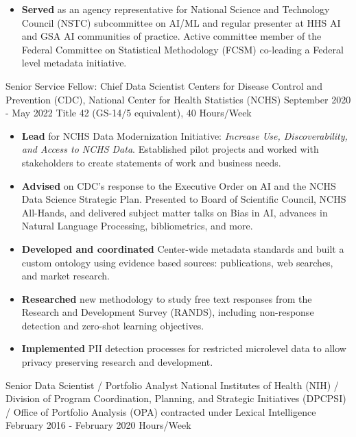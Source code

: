 \documentclass[]{scrartcl}
\begin{document}
\begin{cleanCV}
{\begin{itemize}
      \item \textbf{Served} as an agency representative for National Science and Technology Council (NSTC) subcommittee on AI/ML and regular presenter at HHS AI and GSA AI communities of practice. Active committee member of the Federal Committee on Statistical Methodology (FCSM) co-leading a Federal level metadata initiative.

  \end{itemize}
}

\vspace{1em}

    
  \WorkExperience
{}
{Senior Service Fellow: Chief Data Scientist}
{
  \newline Centers for Disease Control and Prevention (CDC), National Center for
Health Statistics (NCHS)
  \newline September 2020 - May 2022
  \newline Title 42 (GS-14/5 equivalent), 40 Hours/Week
}
{
  \vspace{-0.25em}
  \begin{itemize}

   \item \textbf{Lead} for NCHS Data Modernization Initiative: \emph{Increase Use, Discoverability, and Access to NCHS Data}. Established pilot projects and worked with stakeholders to create statements of work and business needs.
   \item \textbf{Advised} on CDC's response to the Executive Order on AI and the NCHS Data Science Strategic Plan. Presented to Board of Scientific Council, NCHS All-Hands, and delivered subject matter talks on Bias in AI, advances in Natural Language Processing, bibliometrics, and more.
   \item \textbf{Developed and coordinated} Center-wide metadata standards and built a custom ontology using evidence based sources: publications, web searches, and market research.
   \item \textbf{Researched} new methodology to study free text responses from the Research and Development Survey (RANDS), including non-response detection and zero-shot learning objectives.
   \item \textbf{Implemented} PII detection processes for restricted microlevel data to allow privacy preserving research and development.
  \end{itemize}
}
  
  \WorkExperience
{}
{Senior Data Scientist / Portfolio Analyst}
{
  \newline National Institutes of Health (NIH) / Division of Program Coordination, Planning, and Strategic Initiatives (DPCPSI) / Office of Portfolio Analysis (OPA) contracted under Lexical Intelligence
  \newline February 2016 - February 2020
   Hours/Week
}
{
  \vspace{-0.25em}
  \begin{itemize}
    

\end{itemize}}
\end{cleanCV}
\end{document}
